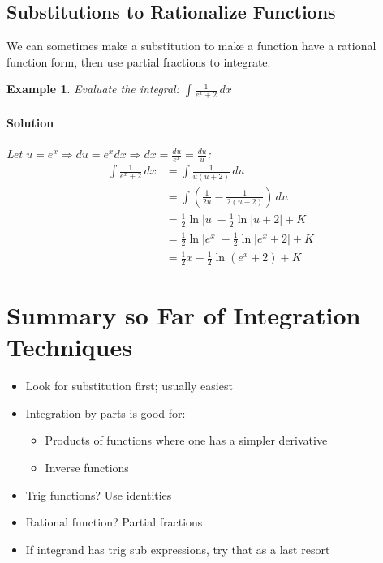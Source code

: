 \documentclass[letterpaper, 11pt, openany]{book}
\theoremstyle{mytheoremstyle}
\theoremstyle{myexamplestyle}
\newtheorem{example}{Example}[section]
\newenvironment{solution}{\paragraph{\sffamily \smaller \fontseries{b}\selectfont Solution}}{\hfill\faSquare}
\begin{document}
\subsection{Substitutions to Rationalize Functions}
We can sometimes make a substitution to make a function have a rational function form, then use partial fractions to integrate.
\begin{example}
    Evaluate the integral: $\displaystyle \int \frac{1}{e^{x} + 2} \, dx$
    \begin{solution}
        Let \(u = e^{x} \Rightarrow du = e^{x}dx \Rightarrow dx = \frac{du}{e^{x}} = \frac{du}{u}\):
        \begin{align*}
            \int \frac{1}{e^{x} + 2} \, dx  &= \int \frac{1}{u(u+2)}\, du\\
                                            &= \int \left(\frac{1}{2 u}-\frac{1}{2 (u+2)}\right)\, du\\
                                            &= \frac{1}{2}\ln |u| - \frac{1}{2}\ln |u+2| + K\\
                                            &= \frac{1}{2}\ln |e^{x}| - \frac{1}{2}\ln |e^{x}+2| + K\\
                                            &= \frac{1}{2} x - \frac{1}{2} \ln (e^{x} + 2) + K
        \end{align*}
    \end{solution}
\end{example}

\section{Summary so Far of Integration Techniques}
\setcounter{figure}{0}
\begin{itemize}
    \item Look for substitution first; usually easiest
    \item Integration by parts is good for:
    \begin{itemize}
        \item Products of functions where one has a simpler derivative
        \item Inverse functions
    \end{itemize}
    \item Trig functions? Use identities
    \item Rational function? Partial fractions
    \item If integrand has trig sub expressions, try that as a last resort \faMeh
\end{itemize}
\end{document}
